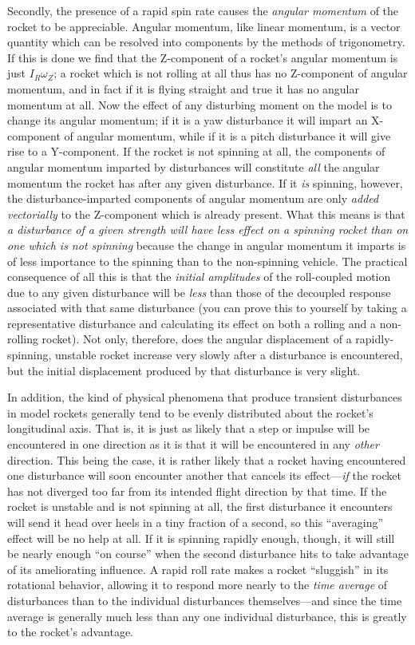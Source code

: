 Secondly, the presence of a rapid spin rate causes the \emph{angular momentum}
of the rocket to be appreciable. Angular momentum, like linear momentum, is a
vector quantity which can be resolved into components by the methods of
trigonometry. If this is done we find that the Z-component of a rocket's
angular momentum is just $I_R\omega_Z$; a rocket which is not rolling at all
thus has no Z-component of angular momentum, and in fact if it is flying
straight and true it has no angular momentum at all. Now the effect of any
disturbing moment on the model is to change its angular momentum; if it is a
yaw disturbance it will impart an X-component of angular momentum, while if it
is a pitch disturbance it will give rise to a Y-component. If the rocket is
not spinning at all, the components of angular momentum imparted by
disturbances will constitute \emph{all} the angular momentum the rocket has
after any given disturbance. If it \emph{is} spinning, however, the
disturbance-imparted components of angular momentum are only \emph{added
vectorially} to the Z-component which is already present. What this means is
that \emph{a disturbance of a given strength will have less effect on a
spinning rocket than on one which is not spinning} because the change in
angular momentum it imparts is of less importance to the spinning than to the
non-spinning vehicle. The practical consequence of all this is that the
\emph{initial amplitudes} of the roll-coupled motion due to any given
disturbance will be \emph{less} than those of the decoupled response
associated with that same disturbance (you can prove this to yourself by
taking a representative disturbance and calculating its effect on both a
rolling and a non-rolling rocket). Not only, therefore, does the angular
displacement of a rapidly-spinning, unstable rocket increase very slowly after
a disturbance is encountered, but the initial displacement produced by that
disturbance is very slight.

In addition, the kind of physical phenomena that produce transient
disturbances in model rockets generally tend to be evenly distributed about
the rocket's longitudinal axis. That is, it is just as likely that a step or
impulse will be encountered in one direction as it is that it will be
encountered in any \emph{other} direction. This being the case, it is rather
likely that a rocket having encountered one disturbance will soon encounter
another that cancels its effect---\emph{if} the rocket has not diverged too
far from its intended flight direction by that time. If the rocket is unstable
and is not spinning at all, the first disturbance it encounters will send it
head over heels in a tiny fraction of a second, so this ``averaging'' effect
will be no help at all. If it is spinning rapidly enough, though, it will
still be nearly enough ``on course'' when the second disturbance hits to take
advantage of its ameliorating influence. A rapid roll rate makes a rocket
``sluggish'' in its rotational behavior, allowing it to respond more nearly to
the \emph{time average} of disturbances than to the individual disturbances
themselves---and since the time average is generally much less than any one
individual disturbance, this is greatly to the rocket's advantage.

